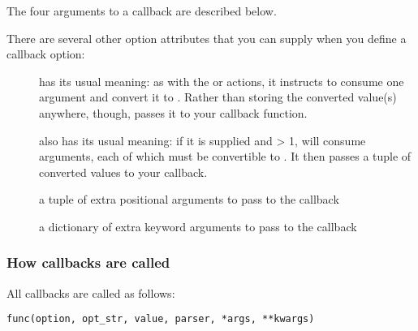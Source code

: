 The four arguments to a callback are described below.

There are several other option attributes that you can supply when you
define a callback option:
\begin{description}
\item[]
has its usual meaning: as with the  or  actions,
it instructs  to consume one argument and convert it to
.  Rather than storing the converted value(s) anywhere,
though,  passes it to your callback function.
\item[]
also has its usual meaning: if it is supplied and {\textgreater} 1,  will
consume  arguments, each of which must be convertible to
.  It then passes a tuple of converted values to your
callback.
\item[]
a tuple of extra positional arguments to pass to the callback
\item[]
a dictionary of extra keyword arguments to pass to the callback
\end{description}


\subsubsection{How callbacks are called\label{optparse-how-callbacks-called}}

All callbacks are called as follows:
\begin{verbatim}
func(option, opt_str, value, parser, *args, **kwargs)
\end{verbatim}

